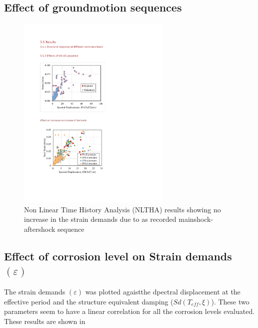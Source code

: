 \subsection{Effect of groundmotion sequences}

\begin{figure}[htbp]
	\centering
	\includegraphics[width=0.65\textwidth]{VAC Thesis 2.0/Chapter-5/figs/MS_AS_results_noincrease_in_demands.pdf}
	\caption{Non Linear Time History Analysis (NLTHA) results showing no increase in the strain demands due to as recorded mainshock-aftershock sequence}
	\label{fig:ms_as_results}
\end{figure}

\subsection{Effect of corrosion level on Strain demands $(\varepsilon)$}

The strain demands $(\varepsilon)$ was plotted agaistthe dpectral displacement at the effective period and the structure equivalent damping ($Sd(T_{eff},\xi)$). These two parameters seem to have a linear correlation for all the corrosion levels evaluated. These results are shown in 

